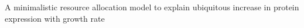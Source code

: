 A minimalistic resource allocation model to explain ubiquitous increase in protein expression with growth rate